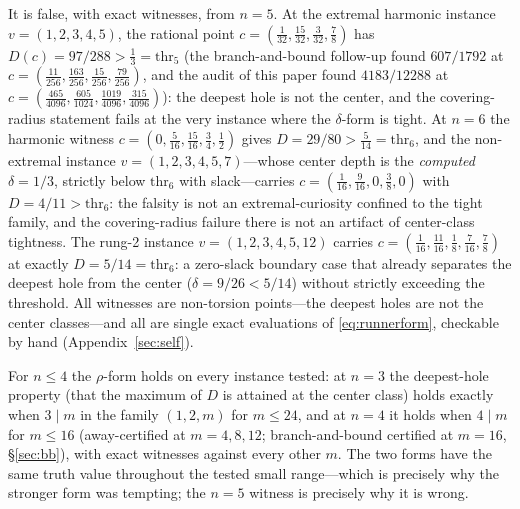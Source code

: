 It is false, with exact witnesses, from $n=5$. At the extremal harmonic
instance $v=(1,2,3,4,5)$, the rational point
$c=(\tfrac1{32},\tfrac{15}{32},\tfrac3{32},\tfrac78)$ has
$D(c)=97/288>\tfrac13=\mathrm{thr}_5$ (the branch-and-bound follow-up
found $607/1792$ at
$c=(\tfrac{11}{256},\tfrac{163}{256},\tfrac{15}{256},
\tfrac{79}{256})$, and the audit of this paper found
$4183/12288$ at
$c=(\tfrac{465}{4096},\tfrac{605}{1024},\tfrac{1019}{4096},
\tfrac{315}{4096})$): the deepest hole is not the center, and the
covering-radius statement fails at the very instance where the
$\delta$-form is tight. At $n=6$ the harmonic witness
$c=(0,\tfrac5{16},\tfrac{15}{16},\tfrac34,\tfrac12)$ gives
$D=29/80>\tfrac5{14}=\mathrm{thr}_6$, and the non-extremal instance
$v=(1,2,3,4,5,7)$---whose center depth is the \emph{computed}
$\delta=1/3$, strictly below $\mathrm{thr}_6$ with slack---carries
$c=(\tfrac1{16},\tfrac9{16},0,\tfrac38,0)$
with $D=4/11>\mathrm{thr}_6$: the falsity is not an extremal-curiosity
confined to the tight family, and the covering-radius failure there is
not an artifact of center-class tightness. The rung-2 instance
$v=(1,2,3,4,5,12)$ carries $c=(\tfrac1{16},\tfrac{11}{16},\tfrac18,
\tfrac7{16},\tfrac78)$ at exactly $D=5/14=\mathrm{thr}_6$: a
zero-slack boundary case that already separates the deepest hole from
the center ($\delta=9/26<5/14$) without strictly exceeding the
threshold. All witnesses are non-torsion points---the deepest holes are
not the center classes---and all are single exact evaluations of
\eqref{eq:runnerform}, checkable by hand (Appendix~\ref{sec:self}).

For $n\le4$ the $\rho$-form holds on every instance tested: at $n=3$
the deepest-hole property (that the maximum of $D$ is attained at the
center class) holds exactly when $3\mid m$ in the family
$(1,2,m)$ for $m\le24$, and at $n=4$ it holds when $4\mid m$ for
$m\le16$ (away-certified at $m=4,8,12$; branch-and-bound certified at
$m=16$, \S\ref{sec:bb}), with exact witnesses against every other $m$.
The two forms have the same truth value throughout the tested small
range---which is precisely why the stronger form was tempting; the
$n=5$ witness is precisely why it is wrong.

